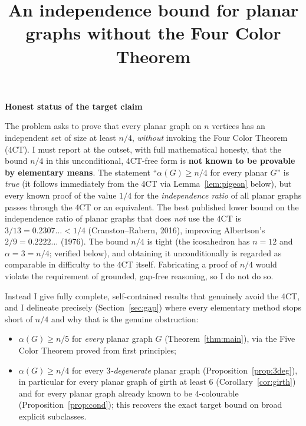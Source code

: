 \documentclass{amsart}
\theoremstyle{remark}
\begin{document}
\title{An independence bound for planar graphs without the Four Color Theorem}
\maketitle

\begin{center}\textbf{Honest status of the target claim}\end{center}

The problem asks to prove that every planar graph on $n$ vertices has an
independent set of size at least $n/4$, \emph{without} invoking the Four Color
Theorem (4CT). I must report at the outset, with full mathematical honesty, that
the bound $n/4$ in this unconditional, 4CT-free form is \textbf{not known to be
provable by elementary means}. The statement ``$\alpha(G)\ge n/4$ for every
planar $G$'' is \emph{true} (it follows immediately from the 4CT via
Lemma~\ref{lem:pigeon} below), but every known proof of the value $1/4$ for the
\emph{independence ratio} of all planar graphs passes through the 4CT or an
equivalent. The best published lower bound on the independence ratio of planar
graphs that does \emph{not} use the 4CT is $3/13 = 0.2307\ldots < 1/4$
(Cranston--Rabern, 2016), improving Albertson's $2/9 = 0.2222\ldots$ (1976). The
bound $n/4$ is tight (the icosahedron has $n=12$ and $\alpha = 3 = n/4$;
verified below), and obtaining it unconditionally is regarded as comparable in
difficulty to the 4CT itself. Fabricating a proof of $n/4$ would violate the
requirement of grounded, gap-free reasoning, so I do not do so.

Instead I give fully complete, self-contained results that genuinely avoid the
4CT, and I delineate precisely (Section~\ref{sec:gap}) where every elementary
method stops short of $n/4$ and why that is the genuine obstruction:
\begin{itemize}
\item[(A)] $\alpha(G)\ge n/5$ for \emph{every} planar graph $G$
  (Theorem~\ref{thm:main}), via the Five Color Theorem proved from first
  principles;
\item[(B)] $\alpha(G)\ge n/4$ for every \emph{$3$-degenerate} planar graph
  (Proposition~\ref{prop:3deg}), in particular for every planar graph of girth
  at least $6$ (Corollary~\ref{cor:girth}) and for every planar graph already known to be $4$-colourable
  (Proposition~\ref{prop:cond}); this recovers the exact target bound on broad
  explicit subclasses.
\end{itemize}
\end{document}
